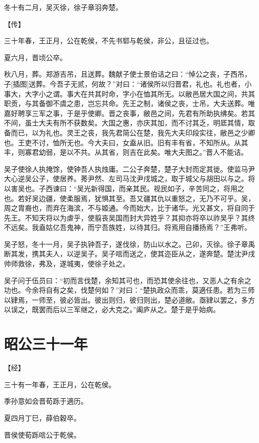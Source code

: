 \documentclass[a4paper,12pt,UTF8,twoside]{ctexbook}
\begin{document}
冬十有二月，吴灭徐，徐子章羽奔楚。

【传】

三十年春，王正月，公在乾侯，不先书郓与乾侯，非公，且征过也。

夏六月，晋顷公卒。

秋八月，葬。郑游吉吊，且送葬。魏献子使士景伯诘之曰：“悼公之丧，子西吊，子[插图]送葬。今吾子无贰，何故？”对曰：“诸侯所以归晋君，礼也。礼也者，小事大，大字小之谓。事大在共其时命，字小在恤其所无。以敝邑居大国之间，共其职贡，与其备御不虞之患，岂忘共命。先王之制，诸侯之丧，士吊，大夫送葬。唯嘉好聘享三军之事，于是乎使卿。晋之丧事，敝邑之间，先君有所助执绋矣。若其不间，虽士大夫有所不获数矣。大国之惠，亦庆其加，而不讨其乏，明厎其情，取备而已，以为礼也。灵王之丧，我先君简公在楚，我先大夫印段实往，敝邑之少卿也。王吏不讨，恤所无也。今大夫曰，女盍从旧。旧有丰有省，不知所从。从其丰，则寡君幼弱，是以不共。从其省，则吉在此矣。唯大夫图之。”晋人不能诘。

吴子使徐人执掩馀，使钟吾人执烛庸。二公子奔楚，楚子大封而定其徙。使监马尹大心逆吴公子，使居养。莠尹然、左司马沈尹戌城之，取于城父与胡田以与之。将以害吴也。子西谏曰：“吴光新得国，而亲其民。视民如子，辛苦同之，将用之也。若好吴边疆，使柔服焉，犹惧其至。吾又疆其仇以重怒之，无乃不可乎。吴，周之胄裔也，而弃在海滨，不与姬通。今而始大，比于诸华。光又甚文，将自同于先王。不知天将以为虐乎，使翦丧吴国而封大异姓乎？其抑亦将卒以祚吴乎？其终不远矣。我盍姑亿吾鬼神，而宁吾族姓，以待其归。将焉用自播扬焉？”王弗听。

吴子怒，冬十一月，吴子执钟吾子，遂伐徐，防山以水之。己卯，灭徐。徐子章禹断其发，携其夫人，以逆吴子。吴子唁而送之，使其迩臣从之，遂奔楚。楚沈尹戌帅师救徐，弗及，遂城夷，使徐子处之。

吴子问于伍员曰：“初而言伐楚，余知其可也，而恐其使余往也，又恶人之有余之功也。今余将自有之矣，伐楚何如？”对曰：“楚执政众而乖，莫適任患。若为三师以肄焉，一师至，彼必皆出。彼出则归，彼归则出，楚必道敝。亟肄以罢之，多方以误之，既罢而后以三军继之，必大克之。”阖庐从之。楚于是乎始病。


\section{昭公三十一年}



【经】

三十有一年春，王正月，公在乾侯。

季孙意如会晋荀跞于適历。

夏四月丁巳，薛伯穀卒。

晋侯使荀跞唁公于乾侯。
\end{document}
